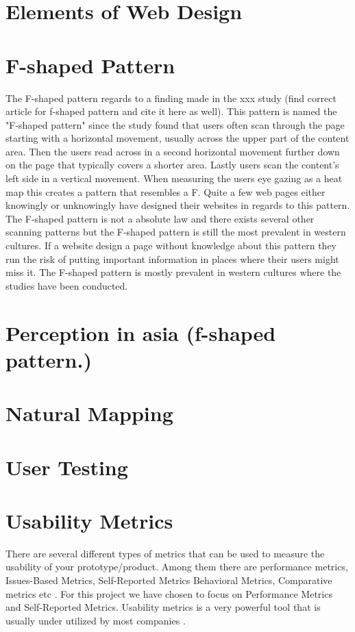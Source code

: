 \section{Elements of Web Design}
\section{F-shaped Pattern}
The F-shaped pattern regards to a finding made in the xxx study \cite{pernice2014people} (find correct article for f-shaped pattern and cite it here as well). This pattern is named the "F-shaped pattern" since the study found that users often scan through the page starting with a horizontal movement, usually across the upper part of the content area. Then the users read across in a second horizontal movement further down on the page that typically covers a shorter area. Lastly users scan the content’s left side in a vertical movement. When measuring the users eye gazing as a heat map this creates a pattern that resembles a F. Quite a few web pages either knowingly or unknowingly have designed their websites in regards to this pattern. The F-shaped pattern is not a absolute law and there exists several other scanning patterns but the F-shaped pattern is still the most prevalent in western cultures. \cite{f-shape_today} If a website design a page without knowledge about this pattern they run the risk of putting important information in places where their users might miss it. The F-shaped pattern is mostly prevalent in western cultures where the studies have been conducted.

\section{Perception in asia (f-shaped pattern.)}

\section{Natural Mapping}
\section{User Testing}

\section{Usability Metrics}
There are several different types of metrics that can be used to measure the usability of your prototype/product. Among them there are performance metrics, Issues-Based Metrics, Self-Reported Metrics Behavioral Metrics, Comparative metrics etc \cite{tullis_albert_2011}. For this project we have chosen to focus on Performance Metrics and Self-Reported Metrics. Usability metrics is a very powerful tool that is usually under utilized by most companies \cite{norman_metrics}. 
